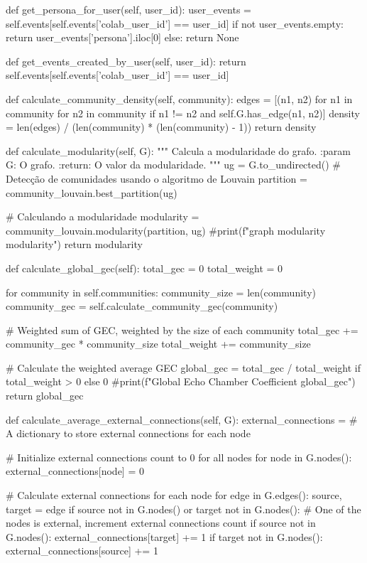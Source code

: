 \begin{codigo}[caption={Exemplo de classe Python para deteção de câmaras de eco}, label={codigo:echochamberdetector}, language=Python, breaklines=true]
    def get_persona_for_user(self, user_id):
        user_events = self.events[self.events['colab_user_id'] == user_id]
        if not user_events.empty:
            return user_events['persona'].iloc[0]
        else:
            return None

    def get_events_created_by_user(self, user_id):
        return self.events[self.events['colab_user_id'] == user_id]

    def calculate_community_density(self, community):
        edges = [(n1, n2) for n1 in community for n2 in community if n1 !=
                 n2 and self.G.has_edge(n1, n2)]
        density = len(edges) / (len(community) * (len(community) - 1))
        return density

    def calculate_modularity(self, G):
        """
        Calcula a modularidade do grafo.
        :param G: O grafo.
        :return: O valor da modularidade.
        """
        ug = G.to_undirected()
        # Detecção de comunidades usando o algoritmo de Louvain
        partition = community_louvain.best_partition(ug)

        # Calculando a modularidade
        modularity = community_louvain.modularity(partition, ug)
        #print(f"graph modularity {modularity}")
        return modularity

    def calculate_global_gec(self):
        total_gec = 0
        total_weight = 0

        for community in self.communities:
            community_size = len(community)
            community_gec = self.calculate_community_gec(community)

            # Weighted sum of GEC, weighted by the size of each community
            total_gec += community_gec * community_size
            total_weight += community_size

        # Calculate the weighted average GEC
        global_gec = total_gec / total_weight if total_weight > 0 else 0
        #print(f"Global Echo Chamber Coefficient {global_gec}")
        return global_gec

    def calculate_average_external_connections(self, G):
        external_connections = {}  # A dictionary to store external connections for each node

        # Initialize external connections count to 0 for all nodes
        for node in G.nodes():
            external_connections[node] = 0

        # Calculate external connections for each node
        for edge in G.edges():
            source, target = edge
            if source not in G.nodes() or target not in G.nodes():
                # One of the nodes is external, increment external connections count
                if source not in G.nodes():
                    external_connections[target] += 1
                if target not in G.nodes():
                    external_connections[source] += 1


\end{codigo}
